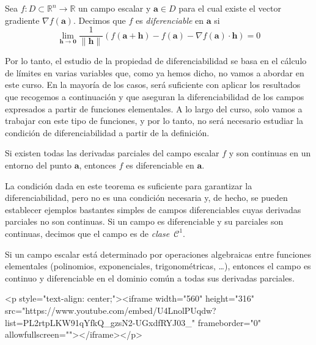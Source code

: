 \begin{definicion}
Sea $f\colon \mathit{D}\subset \mathbb{R}^n\to \mathbb{R}$ un campo escalar y $\boldsymbol a\in \mathit{D}$ para el cual existe el vector gradiente
$\nabla f(\boldsymbol a)$.
Decimos que $f$ es \emph{diferenciable} en $\boldsymbol{a}$ si
\[
\lim_{\boldsymbol{h}\to\boldsymbol{0}}\dfrac{1}{\|\boldsymbol{h}\|}(f(\boldsymbol{a}+\boldsymbol{h})-f(\boldsymbol{a})-\nabla f(\boldsymbol a)\cdot\boldsymbol{h})=0
\]
\end{definicion}

Por lo tanto, el estudio de la propiedad de diferenciabilidad se basa en el cálculo de límites en varias variables que, como ya hemos dicho, no vamos a abordar en este curso.
En la mayoría de los casos, será suficiente con aplicar los resultados que recogemos a continuación y que aseguran la diferenciabilidad de los campos expresados a partir de funciones elementales.
A lo largo del curso, solo vamos a trabajar con este tipo de funciones, y por lo tanto, no será necesario estudiar la condición de diferenciabilidad a partir de la definición.
%
\begin{teorema}
Si existen todas las derivadas parciales del campo escalar $f$ y son continuas en un entorno del punto $\boldsymbol{a}$, entonces $f$ es diferenciable en $\boldsymbol{a}$.
\end{teorema}

La condición dada en este teorema es suficiente para garantizar la diferenciabilidad, pero no es una condición necesaria y, de hecho, se pueden establecer ejemplos bastantes simples de campos diferenciables cuyas derivadas parciales no son continuas.
Si un campo es diferenciable y su parciales son continuas, decimos que el campo es de \emph{clase~$\mathcal C^1$}.

\begin{corolario}
\label{cor:camposc1} Si un campo escalar está determinado por operaciones algebraicas entre funciones elementales
(polinomios, exponenciales, trigonométricas, \dots ),
entonces el campo es continuo y diferenciable en el dominio común a todas sus derivadas parciales.
\end{corolario}


\begin{rawhtml}
<p style="text-align: center;"><iframe width="560" height="316" src="https://www.youtube.com/embed/U4LnolPUqdw?list=PL2rtpLKW91qYfkQ_gzsN2-UGxdfRYJ03_" frameborder="0" allowfullscreen=""></iframe></p>
\end{rawhtml}

